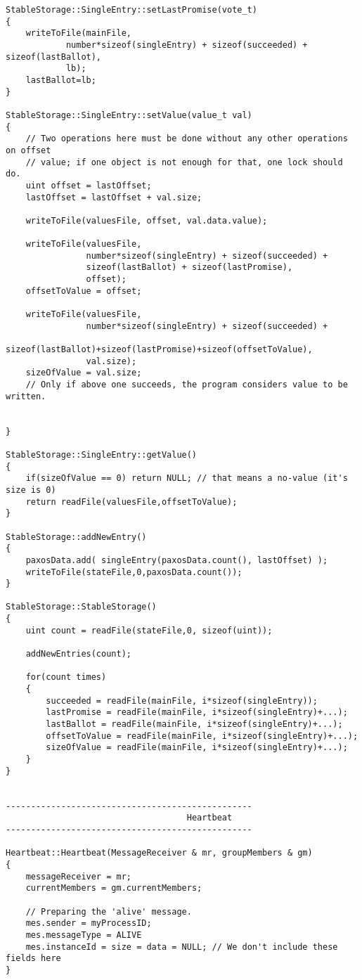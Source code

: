 \begin{lstlisting}[frame=lines,caption=Pseudocode of Paxos algorithm]
StableStorage::SingleEntry::setLastPromise(vote_t)
{
	writeToFile(mainFile,
			number*sizeof(singleEntry) + sizeof(succeeded) + sizeof(lastBallot),
			lb);
	lastBallot=lb;
}

StableStorage::SingleEntry::setValue(value_t val)
{
	// Two operations here must be done without any other operations on offset
	// value; if one object is not enough for that, one lock should do.
	uint offset = lastOffset;
	lastOffset = lastOffset + val.size;

	writeToFile(valuesFile, offset, val.data.value);

	writeToFile(valuesFile,
				number*sizeof(singleEntry) + sizeof(succeeded) +
				sizeof(lastBallot) + sizeof(lastPromise),
				offset);
	offsetToValue = offset;

	writeToFile(valuesFile,
				number*sizeof(singleEntry) + sizeof(succeeded) +
				sizeof(lastBallot)+sizeof(lastPromise)+sizeof(offsetToValue),
				val.size);
	sizeOfValue = val.size;
	// Only if above one succeeds, the program considers value to be written.


}

StableStorage::SingleEntry::getValue()
{
	if(sizeOfValue == 0) return NULL; // that means a no-value (it's size is 0)
	return readFile(valuesFile,offsetToValue);
}

StableStorage::addNewEntry()
{
	paxosData.add( singleEntry(paxosData.count(), lastOffset) );
	writeToFile(stateFile,0,paxosData.count());
}

StableStorage::StableStorage()
{
	uint count = readFile(stateFile,0, sizeof(uint));

	addNewEntries(count);

	for(count times)
	{
		succeeded = readFile(mainFile, i*sizeof(singleEntry));
		lastPromise = readFile(mainFile, i*sizeof(singleEntry)+...);
		lastBallot = readFile(mainFile, i*sizeof(singleEntry)+...);
		offsetToValue = readFile(mainFile, i*sizeof(singleEntry)+...);
		sizeOfValue = readFile(mainFile, i*sizeof(singleEntry)+...);
	}
}


-------------------------------------------------
                                    Heartbeat
-------------------------------------------------

Heartbeat::Heartbeat(MessageReceiver & mr, groupMembers & gm)
{
	messageReceiver = mr;
	currentMembers = gm.currentMembers;
	
	// Preparing the 'alive' message.
	mes.sender = myProcessID;
	mes.messageType = ALIVE
	mes.instanceId = size = data = NULL; // We don't include these fields here
}


\end{lstlisting}

